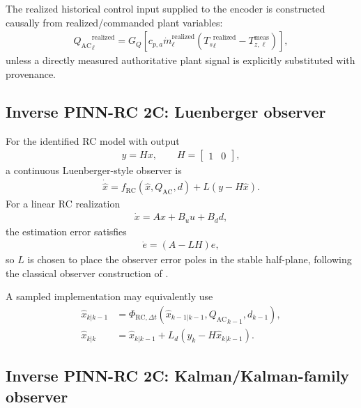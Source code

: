 \documentclass[11pt]{article}
\newcommand{\Ts}{T_s}
\newcommand{\mdot}{\dot m}
\newcommand{\QAC}{Q_{\mathrm{AC}}}
\begin{document}
The realized historical control input supplied to the encoder is constructed causally from
realized/commanded plant variables:
\begin{align}
{\QAC}_{\ell}^{\mathrm{realized}}
=
G_Q
\left[
c_{p,a}
\mdot_{\ell}^{\mathrm{realized}}
\left(
{\Ts}_{\ell}^{\mathrm{realized}}
-
T_{z,\ell}^{\mathrm{meas}}
\right)
\right],
\tag{6.51}
\end{align}
unless a directly measured authoritative plant signal is explicitly substituted with provenance.

\subsection{Inverse PINN-RC 2C: Luenberger observer}

For the identified RC model with output
\begin{align}
y=Hx,
\qquad
H=
\begin{bmatrix}
1&0
\end{bmatrix},
\tag{6.52}
\end{align}
a continuous Luenberger-style observer is
\begin{align}
\boxed{
\dot{\widehat x}
=
f_{\mathrm{RC}}(\widehat x,\QAC,d)
+
L
\left(
y-H\widehat x
\right).
}
\tag{6.53}
\end{align}
For a linear RC realization
\begin{align}
\dot x=Ax+B_u u+B_dd,
\end{align}
the estimation error satisfies
\begin{align}
\dot e=(A-LH)e,
\tag{6.54}
\end{align}
so \(L\) is chosen to place the observer error poles in the stable half-plane, following the
classical observer construction of \citet{luenberger1966observer}.

A sampled implementation may equivalently use
\begin{align}
\widehat x_{k|k-1}
&=
\Phi_{\mathrm{RC},\Delta t}
(
\widehat x_{k-1|k-1},{\QAC}_{k-1},d_{k-1}
),
\\
\widehat x_{k|k}
&=
\widehat x_{k|k-1}
+
L_d
\left(
y_k-H\widehat x_{k|k-1}
\right).
\tag{6.55}
\end{align}

\subsection{Inverse PINN-RC 2C: Kalman/Kalman-family observer}
\end{document}
